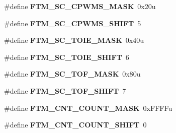 \begin{DoxyCompactItemize}
\item 
\hypertarget{group___f_t_m___register___masks_gaccb41101ca573d24de634c5a19d13467}{}\#define {\bfseries F\+T\+M\+\_\+\+S\+C\+\_\+\+C\+P\+W\+M\+S\+\_\+\+M\+A\+S\+K}~0x20u\label{group___f_t_m___register___masks_gaccb41101ca573d24de634c5a19d13467}

\item 
\hypertarget{group___f_t_m___register___masks_ga91d4d626c21437a2b8b15e9a2a385727}{}\#define {\bfseries F\+T\+M\+\_\+\+S\+C\+\_\+\+C\+P\+W\+M\+S\+\_\+\+S\+H\+I\+F\+T}~5\label{group___f_t_m___register___masks_ga91d4d626c21437a2b8b15e9a2a385727}

\item 
\hypertarget{group___f_t_m___register___masks_ga65e89cf2978e1c61f40b229b66b3e7c8}{}\#define {\bfseries F\+T\+M\+\_\+\+S\+C\+\_\+\+T\+O\+I\+E\+\_\+\+M\+A\+S\+K}~0x40u\label{group___f_t_m___register___masks_ga65e89cf2978e1c61f40b229b66b3e7c8}

\item 
\hypertarget{group___f_t_m___register___masks_ga3d59d98a90d574503733c8a1abd2e7ae}{}\#define {\bfseries F\+T\+M\+\_\+\+S\+C\+\_\+\+T\+O\+I\+E\+\_\+\+S\+H\+I\+F\+T}~6\label{group___f_t_m___register___masks_ga3d59d98a90d574503733c8a1abd2e7ae}

\item 
\hypertarget{group___f_t_m___register___masks_gaeea3d5615ca8e996e87e6f9aacdfb4fb}{}\#define {\bfseries F\+T\+M\+\_\+\+S\+C\+\_\+\+T\+O\+F\+\_\+\+M\+A\+S\+K}~0x80u\label{group___f_t_m___register___masks_gaeea3d5615ca8e996e87e6f9aacdfb4fb}

\item 
\hypertarget{group___f_t_m___register___masks_ga1f12d6f2ddbc4a71756f2b0203ab57dd}{}\#define {\bfseries F\+T\+M\+\_\+\+S\+C\+\_\+\+T\+O\+F\+\_\+\+S\+H\+I\+F\+T}~7\label{group___f_t_m___register___masks_ga1f12d6f2ddbc4a71756f2b0203ab57dd}

\item 
\hypertarget{group___f_t_m___register___masks_ga7a984be18d311688f8a369a43f9145b6}{}\#define {\bfseries F\+T\+M\+\_\+\+C\+N\+T\+\_\+\+C\+O\+U\+N\+T\+\_\+\+M\+A\+S\+K}~0x\+F\+F\+F\+Fu\label{group___f_t_m___register___masks_ga7a984be18d311688f8a369a43f9145b6}

\item 
\hypertarget{group___f_t_m___register___masks_gacab5bfefd759b4b0d8e4949a872f96e2}{}\#define {\bfseries F\+T\+M\+\_\+\+C\+N\+T\+\_\+\+C\+O\+U\+N\+T\+\_\+\+S\+H\+I\+F\+T}~0\label{group___f_t_m___register___masks_gacab5bfefd759b4b0d8e4949a872f96e2}


\end{DoxyCompactItemize}
